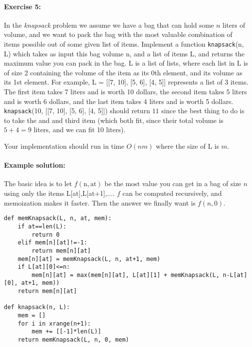 \documentclass[11pt]{article}
\begin{document}
\paragraph{Exercise 5:}
In the {\em knapsack} problem we assume we have a bag that can hold
some $n$ liters of volume, and we want to pack the bag with the most
valuable combination of items possible out of some given list of
items.  Implement a function
\texttt{knapsack}(n, L) which takes as input this bag volume n, and a
list of items L, and returns the maximum value you can pack in the
bag.  L is a list of lists, where each list in L is of size 2
containing the volume of the item as its 0th element, and its volume
as its 1st element.  For example, L = [[7, 10], [5, 6], [4, 5]]
represents a list of 3 items.  The first item takes 7 liters and is
worth 10 dollars, the second item takes 5 liters and is worth 6
dollars, and the last item takes 4 liters and is worth 5 dollars.
\texttt{knapsack}(10, [[7, 10], [5, 6], [4, 5]]) should return $11$
since the best thing to do is to take the and and third item (which
both fit, since their total volume is $5+4=9$ liters, and we can fit
10 liters).

Your implementation should run in time $O(nm)$ where the size of L is
$m$.

\paragraph{Example solution:}
The basic idea is to let $f(\mathrm{n}, \mathrm{at})$ be the most
value you can get in a bag of size $n$ using only the items
L[at],L[at+1],$\ldots$.  $f$ can be computed recursively, and
memoization makes it faster.  Then the answer we finally want is $f(n,
0)$.

\begin{verbatim}
def memKnapsack(L, n, at, mem):
    if at==len(L):
        return 0
    elif mem[n][at]!=-1:
        return mem[n][at]
    mem[n][at] = memKnapsack(L, n, at+1, mem)
    if L[at][0]<=n:
        mem[n][at] = max(mem[n][at], L[at][1] + memKnapsack(L, n-L[at][0], at+1, mem))
    return mem[n][at]    

def knapsack(n, L):
    mem = []
    for i in xrange(n+1):
        mem += [[-1]*len(L)]
    return memKnapsack(L, n, 0, mem)
\end{verbatim}
\end{document}
